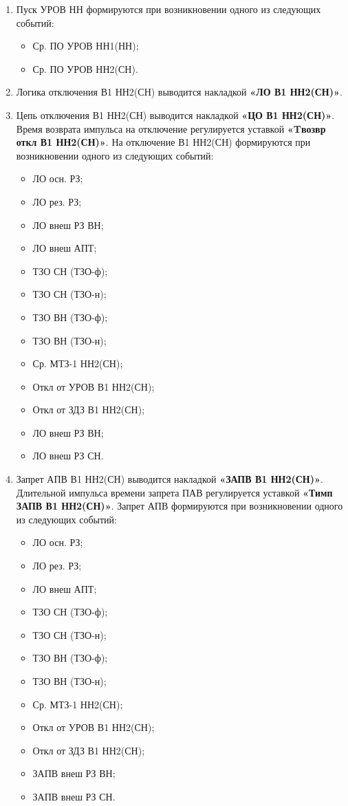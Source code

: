 \begin{enumerate}[label=\arabic{section}.\arabic{subsection}.\arabic{subsubsection}.\arabic*,  align=left, labelsep=4pt, leftmargin=0pt, itemindent=57pt]
\item
Пуск УРОВ НН формируются при возникновении одного из следующих событий:
\begin{itemize}
\item Ср. ПО УРОВ НН1(НН);
\item Ср. ПО УРОВ НН2(СН).
\end{itemize}

\item
Логика отключения В1 НН2(СН) выводится накладкой \textbf{«ЛО В1 НН2(СН)»}.

\item
Цепь отключения В1 НН2(СН) выводится накладкой \textbf{«ЦО В1 НН2(СН)»}. Время возврата импульса
на отключение регулируется уставкой \textbf{«Tвозвр откл В1 НН2(СН)»}. На отключение В1 НН2(СН)
формируются при возникновении одного из следующих событий:
\begin{itemize}
\item ЛО осн. РЗ;
\item ЛО рез. РЗ;
\item ЛО внеш РЗ ВН;
\item ЛО внеш АПТ;
\item ТЗО СН (ТЗО-ф);
\item ТЗО СН (ТЗО-н);
\item ТЗО ВН (ТЗО-ф);
\item ТЗО ВН (ТЗО-н);
\item Ср. МТЗ-1 НН2(СН);
\item Откл от УРОВ В1 НН2(СН);
\item Откл от ЗДЗ В1 НН2(СН);
\item ЛО внеш РЗ ВН;
\item ЛО внеш РЗ СН.
\end{itemize}

\item
Запрет АПВ В1 НН2(СН) выводится накладкой \textbf{«ЗАПВ В1 НН2(СН)»}. Длительной импульса
времени запрета ПАВ регулируется уставкой \textbf{«Тимп ЗАПВ В1 НН2(СН)»}. Запрет АПВ формируются при
возникновении одного из следующих событий:
\begin{itemize}
\item ЛО осн. РЗ;
\item ЛО рез. РЗ;
\item ЛО внеш АПТ;
\item ТЗО СН (ТЗО-ф);
\item ТЗО СН (ТЗО-н);
\item ТЗО ВН (ТЗО-ф);
\item ТЗО ВН (ТЗО-н);
\item Ср. МТЗ-1 НН2(СН);
\item Откл от УРОВ В1 НН2(СН);
\item Откл от ЗДЗ В1 НН2(СН);
\item ЗАПВ внеш РЗ ВН;
\item ЗАПВ внеш РЗ СН.
\end{itemize}


\end{enumerate}
